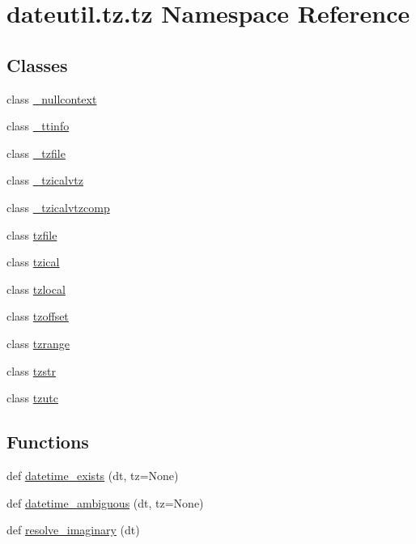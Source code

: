 \hypertarget{namespacedateutil_1_1tz_1_1tz}{}\section{dateutil.\+tz.\+tz Namespace Reference}
\label{namespacedateutil_1_1tz_1_1tz}
\subsection*{Classes}
\begin{DoxyCompactItemize}
\item 
class \hyperlink{classdateutil_1_1tz_1_1tz_1_1__nullcontext}{\+\_\+nullcontext}
\item 
class \hyperlink{classdateutil_1_1tz_1_1tz_1_1__ttinfo}{\+\_\+ttinfo}
\item 
class \hyperlink{classdateutil_1_1tz_1_1tz_1_1__tzfile}{\+\_\+tzfile}
\item 
class \hyperlink{classdateutil_1_1tz_1_1tz_1_1__tzicalvtz}{\+\_\+tzicalvtz}
\item 
class \hyperlink{classdateutil_1_1tz_1_1tz_1_1__tzicalvtzcomp}{\+\_\+tzicalvtzcomp}
\item 
class \hyperlink{classdateutil_1_1tz_1_1tz_1_1tzfile}{tzfile}
\item 
class \hyperlink{classdateutil_1_1tz_1_1tz_1_1tzical}{tzical}
\item 
class \hyperlink{classdateutil_1_1tz_1_1tz_1_1tzlocal}{tzlocal}
\item 
class \hyperlink{classdateutil_1_1tz_1_1tz_1_1tzoffset}{tzoffset}
\item 
class \hyperlink{classdateutil_1_1tz_1_1tz_1_1tzrange}{tzrange}
\item 
class \hyperlink{classdateutil_1_1tz_1_1tz_1_1tzstr}{tzstr}
\item 
class \hyperlink{classdateutil_1_1tz_1_1tz_1_1tzutc}{tzutc}
\end{DoxyCompactItemize}
\subsection*{Functions}
\begin{DoxyCompactItemize}
\item 
def \hyperlink{namespacedateutil_1_1tz_1_1tz_a4ba2e53b6154f1c008208a7e8b42bfde}{datetime\+\_\+exists} (dt, tz=None)
\item 
def \hyperlink{namespacedateutil_1_1tz_1_1tz_a6d25c2763c71b83d0f613b8e879ee9a9}{datetime\+\_\+ambiguous} (dt, tz=None)
\item 
def \hyperlink{namespacedateutil_1_1tz_1_1tz_a94ecc4305612c58567e0037602edd414}{resolve\+\_\+imaginary} (dt)
\end{DoxyCompactItemize}
